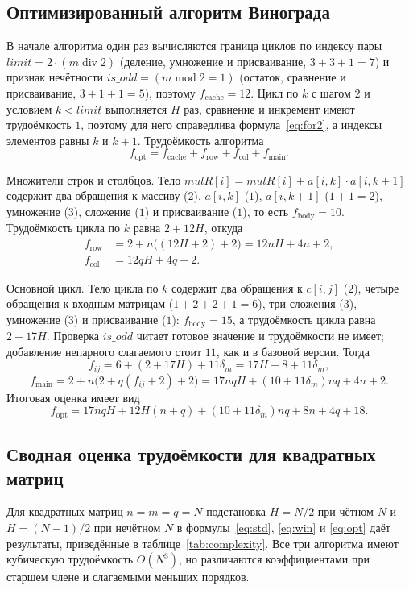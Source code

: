 \documentclass{bmstu}
\begin{document}
\subsection{Оптимизированный алгоритм Винограда}
В начале алгоритма один раз вычисляются граница циклов по индексу пары
$\mathit{limit} = 2\cdot(m \;\mathrm{div}\; 2)$ (деление, умножение и
присваивание, $3+3+1=7$) и признак нечётности
$\mathit{is\_odd} = (m \;\mathrm{mod}\; 2 = 1)$ (остаток, сравнение и
присваивание, $3+1+1=5$), поэтому $f_{\mathrm{cache}}=12$. Цикл по $k$ с шагом
$2$ и условием $k < \mathit{limit}$ выполняется $H$ раз, сравнение и
инкремент имеют трудоёмкость $1$, поэтому для него справедлива
формула~\eqref{eq:for2}, а индексы элементов равны $k$ и $k+1$. Трудоёмкость
алгоритма
\begin{equation}
	f_{\mathrm{opt}}=f_{\mathrm{cache}}+f_{\mathrm{row}}+f_{\mathrm{col}}+
	f_{\mathrm{main}}.
\end{equation}

Множители строк и столбцов. Тело
$\mathit{mulR}[i] = \mathit{mulR}[i] + a[i,k]\cdot a[i,k+1]$
содержит два обращения к массиву ($2$), $a[i,k]$ ($1$), $a[i,k+1]$
($1+1=2$), умножение ($3$), сложение ($1$) и присваивание ($1$), то есть
$f_{\mathrm{body}}=10$. Трудоёмкость цикла по $k$ равна $2+12H$, откуда
\begin{align}
	f_{\mathrm{row}} & =2+n\bigl((12H+2)+2\bigr)=12nH+4n+2, \\
	f_{\mathrm{col}} & =12qH+4q+2.
\end{align}

Основной цикл. Тело цикла по $k$ содержит два обращения к $c[i,j]$
($2$), четыре обращения к входным матрицам ($1+2+2+1=6$), три сложения ($3$),
умножение ($3$) и присваивание ($1$): $f_{\mathrm{body}}=15$, а трудоёмкость
цикла равна $2+17H$. Проверка $\mathit{is\_odd}$ читает готовое значение и
трудоёмкости не имеет; добавление непарного слагаемого стоит $11$, как и в
базовой версии. Тогда
\begin{equation}
	f_{ij}=6+(2+17H)+11\delta_m=17H+8+11\delta_m,
\end{equation}
\begin{equation}
	f_{\mathrm{main}}=2+n\bigl(2+q(f_{ij}+2)+2\bigr)=
	17nqH+(10+11\delta_m)nq+4n+2.
\end{equation}
Итоговая оценка имеет вид
\begin{equation}
	\label{eq:opt}
	f_{\mathrm{opt}}=17nqH+12H(n+q)+(10+11\delta_m)nq+8n+4q+18.
\end{equation}

\subsection{Сводная оценка трудоёмкости для квадратных матриц}
Для квадратных матриц $n=m=q=N$ подстановка $H=N/2$ при чётном $N$ и
$H=(N-1)/2$ при нечётном $N$ в формулы~\eqref{eq:std}, \eqref{eq:win} и
\eqref{eq:opt} даёт результаты, приведённые в таблице~\ref{tab:complexity}.
Все три алгоритма имеют кубическую трудоёмкость $O(N^3)$, но различаются
коэффициентами при старшем члене и слагаемыми меньших порядков.
\end{document}
